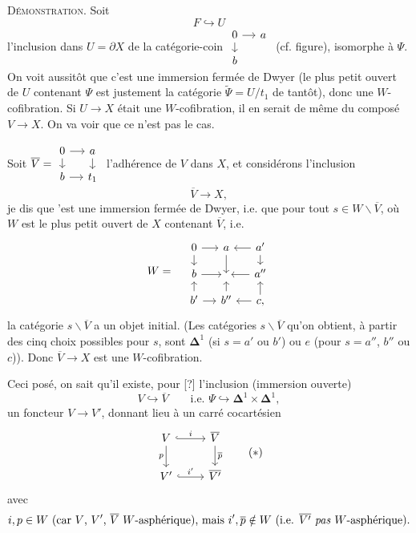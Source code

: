 \documentclass[11pt]{article}
\newcommand{\printedpage}[1]{\marginpar{\footnotesize p.~#1}}
\newcommand{\msp}[1]{\marginpar{\footnotesize [#1]}}
\begin{document}
\printedpage{10}
\textsc{Démonstration}. Soit
\[ F \hookrightarrow U \]
l'inclusion dans $U = \partial X$ de la catégorie-coin $\vcenter{\hbox{\begin{tikzcd}[row sep=small, column sep=small]
0 \arrow[r] \arrow[d] & a \\
b &
\end{tikzcd}}}$ (cf. figure), isomorphe à $\Psi$. On voit aussitôt que c'est une immersion fermée de Dwyer (le plus petit ouvert de $U$ contenant $\Psi$ est justement la catégorie $\tilde{\Psi} = U/t_1$ de tantôt), donc une $W$-cofibration. Si $U \longrightarrow X$ était une $W$-cofibration, il en serait de même du composé $V \longrightarrow X$. On va voir que ce n'est pas le cas.

Soit $\overline{V} = \vcenter{\hbox{\begin{tikzcd}[row sep=small, column sep=small]
0 \arrow[r] \arrow[d] & a \arrow[d] \\
b \arrow[r] & t_1
\end{tikzcd}}}$ l'adhérence de $V$ dans $X$,
\msp{page 14}et considérons l'inclusion
\[ \overline{V} \longrightarrow X, \]
je dis que 'est une immersion fermée de Dwyer, i.e. que pour tout $s \in W\backslash\overline{V}$, où $W$ est le plus petit ouvert de $X$ contenant $\overline{V}$, i.e.
\[
W = \quad
\begin{tikzcd}[row sep=small, column sep=small]
0 \arrow[r] \arrow[d] & a \arrow[d] & a' \arrow[l] \arrow[d] \\
b \arrow[r] & {} & a'' \arrow[l] \\
b' \arrow[u] \arrow[r] & b'' \arrow[u] & c, \arrow[l] \arrow[u]
\end{tikzcd}
\]
la catégorie $s\backslash\overline{V}$ a un objet initial. (Les catégories $s\backslash\overline{V}$ qu'on obtient, à partir des cinq choix possibles pour $s$, sont $\boldsymbol{\Delta}^1$ (si $s = a'$ ou $b'$) ou $e$ (pour $s = a''$, $b''$ ou $c$)). Donc $\overline{V} \longrightarrow X$ est une $W$-cofibration.

Ceci posé, on sait qu'il existe, pour [?] l'inclusion (immersion ouverte)
\[ V \hookrightarrow \overline{V} \qquad \text{i.e. } \Psi \hookrightarrow \boldsymbol{\Delta}^1 \times \boldsymbol{\Delta}^1, \]
un foncteur $V \longrightarrow V'$, donnant lieu à un carré cocartésien
\[
\begin{tikzcd}
V \arrow[r, hook, "i"] \arrow[d, "p"'] & \overline{V} \arrow[d, "\overline{p}"] \\
V' \arrow[r, hook, "i'"] & \overline{V'}
\end{tikzcd}
\tag*{$(*)$}
\]
avec
\[ i, p \in W \ \text{(car $V$, $V'$, $\overline{V}$ $W$-asphérique), mais } i', \overline{p} \notin W \ \text{(i.e. $\overline{V'}$ \textit{pas} $W$-asphérique).} \]
\end{document}
